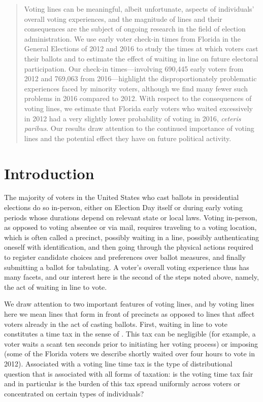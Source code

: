 \documentclass[12pt,titlepage]{article}
\begin{document}
\begin{abstract}
  \noindent 
  Voting lines can be meaningful, albeit unfortunate, aspects of
  individuals' overall voting experiences, and the magnitude of lines
  and their consequences are the subject of ongoing research in the
  field of election administration.  We use early voter check-in times
  from Florida in the General Elections of 2012 and 2016 to study the
  times at which voters cast their ballots and to estimate the effect
  of waiting in line on future electoral participation.  Our check-in
  times---involving 690,445 early voters from 2012 and 769,063 from
  2016---highlight the disproportionately problematic experiences
  faced by minority voters, although we find many fewer such problems
  in 2016 compared to 2012.  With respect to the consequences of
  voting lines, we estimate that Florida early voters who waited
  excessively in 2012 had a very slightly lower probability of voting
  in 2016, \emph{ceteris paribus}.  Our results draw attention to the
  continued importance of voting lines and the potential effect they
  have on future political activity.
\end{abstract}

\newpage
\section*{Introduction}

The majority of voters in the United States who cast ballots in
presidential elections do so in-person, either on Election Day itself
or during early voting periods whose durations depend on relevant
state or local laws. Voting in-person, as opposed to voting absentee
or via mail, requires traveling to a voting location, which is often
called a precinct, possibly waiting in a line, possibly authenticating
oneself with identification, and then going through the physical
actions required to register candidate choices and preferences over
ballot measures, and finally submitting a ballot for tabulating. A
voter's overall voting experience thus has many facets, and our
interest here is the second of the steps noted above, namely, the act
of waiting in line to vote.

We draw attention to two important features of voting lines, and by
voting lines here we mean lines that form in front of precincts as
opposed to lines that affect voters already in the act of casting
ballots.  First, waiting in line to vote constitutes a time tax in the
sense of \cite{mukherjee:timetax}. This tax can be negligible (for
example, a voter waits a scant ten seconds prior to initiating her
voting process) or imposing (some of the Florida voters we describe
shortly waited over four hours to vote in 2012). Associated with a
voting line time tax is the type of distributional question that is
associated with all forms of taxation: is the voting time tax fair and
in particular is the burden of this tax spread uniformly across voters
or concentrated on certain types of individuals?
\end{document}
